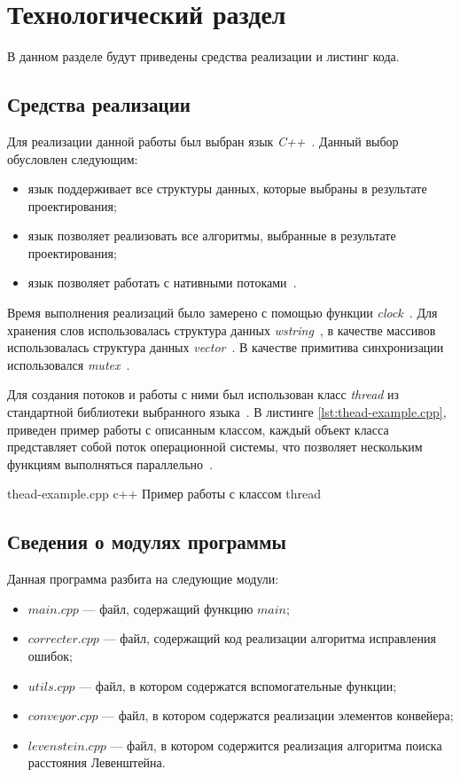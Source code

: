 \chapter{Технологический раздел}

В данном разделе будут приведены  средства реализации и листинг кода.


\section{Средства реализации}

Для реализации данной работы был выбран язык \textit{C++}~\cite{cpp}.
Данный выбор обусловлен следующим:
\begin{itemize}
	\item язык поддерживает все структуры данных, которые выбраны в результате проектирования;
	\item язык позволяет реализовать все алгоритмы, выбранные в результате проектирования;
	\item язык позволяет работать с нативными потоками~\cite{thread}. 
\end{itemize}

Время выполнения реализаций было замерено с помощью функции \textit{clock}~\cite{clock}. 
Для хранения слов использовалась структура данных \textit{wstring}~\cite{wstring}, в качестве массивов использовалась структура данных \textit{vector}~\cite{vector}.
В качестве примитива синхронизации использовался \textit{mutex}~\cite{mutex}.

Для создания потоков и работы с ними был использован класс \textit{thread} из стандартной библиотеки выбранного языка~\cite{thread}.
В листинге \ref{lst:thead-example.cpp}, приведен пример работы с описанным классом, каждый объект класса представляет собой поток операционной системы, что позволяет нескольким функциям выполняться параллельно~\cite{thread}. 

\clearpage
{}
{thead-example.cpp} %
{c++} %
{Пример работы с классом thread} %



\section{Сведения о модулях программы}

Данная программа разбита на следующие модули:
\begin{itemize}
	\item $main.cpp$ --- файл, содержащий функцию $main$;
	\item $correcter.cpp$ --- файл, содержащий код реализации алгоритма исправления ошибок;
	\item $utils.cpp$ --- файл, в котором содержатся вспомогательные функции;
	\item $conveyor.cpp$ --- файл, в котором содержатся реализации элементов конвейера;
	\item $levenstein.cpp$ --- файл, в котором содержится реализация алгоритма поиска расстояния Левенштейна.
\end{itemize}

